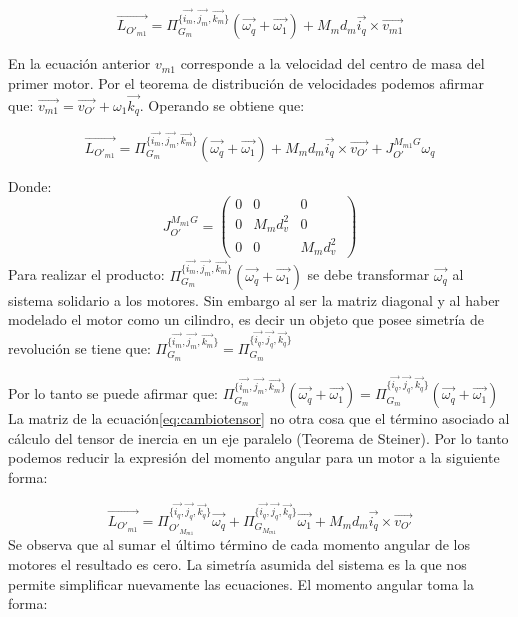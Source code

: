\documentclass[main]{subfiles}
\begin{document}
$$\vec{L_{O\prime_{m1}}} = \Pi_{G_m}^{\{\vec{i_m}, \vec{j_m}, \vec{k_m}\}}(\vec{\omega_q}+\vec{\omega_1})+M_md_m\vec{i_q}\times \vec{v_{m1}} $$


En la ecuaci\'on anterior $v_{m1}$ corresponde a la velocidad del centro de masa del primer motor. Por el teorema de distribuci\'on de velocidades podemos afirmar que: $\vec{v_{m1}}=\vec{v_{O\prime}}+\omega_1\vec{k_q}$. Operando se obtiene que:

$$
\vec{L_{O\prime_{m1}}}= \Pi_{G_m}^{\{\vec{i_m}, \vec{j_m}, \vec{k_m}\}}(\vec{\omega_q}+\vec{\omega_1})+M_md_m\vec{i_q}\times \vec{v_{O\prime}}+J_{O\prime}^{M_{m1}G}\omega_q
$$

Donde: 
\begin{equation}
\label{eq:cambiotensor}
J_{O\prime}^{M_{m1}G}=\left(\begin{array}{ccc}
0 &0 &0 \\
0 &M_md_v^2 &0\\
0 & 0 &M_md_v^2\

\end{array}\right)
\end{equation}
Para realizar el producto:
$
\Pi_{G_m}^{\{\vec{i_m}, \vec{j_m}, \vec{k_m}\}}(\vec{\omega_q}+\vec{\omega_1})
$ se debe transformar $\vec{\omega_q}$ al sistema solidario a los motores.  
Sin embargo al ser la matriz diagonal y al haber modelado el motor como un cilindro, es decir un objeto que posee simetr\'ia de revoluci\'on se tiene que:  $\Pi_{G_m}^{\{\vec{i_m}, \vec{j_m}, \vec{k_m}\}} = \Pi_{G_m}^{\{\vec{i_q}, \vec{j_q}, \vec{k_q}\}}$

Por lo tanto se puede afirmar que:
$\Pi_{G_m}^{\{\vec{i_m}, \vec{j_m}, \vec{k_m}\}}(\vec{\omega_q}+\vec{\omega_1})=\Pi_{G_m}^{\{\vec{i_q}, \vec{j_q}, \vec{k_q}\}}(\vec{\omega_q}+\vec{\omega_1})$
La matriz de la ecuaci\'on\ref{eq:cambiotensor} no otra cosa que el t\'ermino asociado al c\'alculo del tensor de inercia en un eje paralelo (Teorema de Steiner). Por lo tanto podemos reducir la expresi\'on del momento angular para un motor a la siguiente forma:




$$\vec{L_{O\prime_{m1}}}= \Pi_{O\prime_{M_{m1}}}^{\{\vec{i_q}, \vec{j_q}, \vec{k_q}\}}\vec{\omega_q}+\Pi_{G_{M_{m1}}}^{\{\vec{i_q}, \vec{j_q}, \vec{k_q}\}}\vec{\omega_1}+M_md_m\vec{i_q}\times \vec{v_{O\prime}}
$$
Se observa que al sumar el \'ultimo t\'ermino de cada momento angular de los motores el resultado es cero. La simetr\'ia asumida del sistema es la que nos permite simplificar nuevamente las ecuaciones. El momento angular toma la forma:
\end{document}
